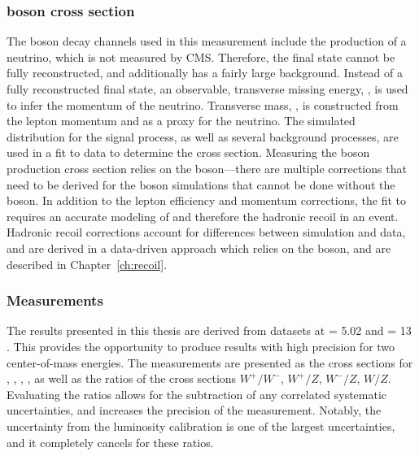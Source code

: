\subsubsection{\W boson cross section}
The \W boson decay channels used in this measurement include the production of a neutrino, which is not measured by CMS. Therefore, the final state cannot be fully reconstructed, and additionally has a fairly large background. Instead of a fully reconstructed final state, an observable, transverse missing energy, \met, is used to infer the momentum of the neutrino. Transverse mass, \mt, is constructed from the lepton momentum and \met as a proxy for the neutrino. The simulated \mt distribution for the \wlnu signal process, as well as several background processes, are used in a fit to data to determine the cross section. 
Measuring the \W boson production cross section relies on the \Z boson---there are multiple corrections that need to be derived for the \W boson simulations that cannot be done without the \Z boson. In addition to the lepton efficiency and momentum corrections, the fit to \mt requires an accurate modeling of \met and therefore the hadronic recoil in an event. Hadronic recoil corrections account for differences between simulation and data, and are derived in a data-driven approach which relies on the \Z boson, and are described in Chapter~\ref{ch:recoil}. 


\subsubsection{Measurements}
The results presented in this thesis are derived from datasets at \s = 5.02 \TeV and \s = 13 \TeV. This provides the opportunity to produce results with high precision for two center-of-mass energies. The measurements are presented as the cross sections for \Wp, \Wm, \W, \Z, as well as the ratios of the cross sections $W^+/W^-$, $W^+/Z$, $W^-/Z$, $W/Z$. Evaluating the ratios allows for the subtraction of any correlated systematic uncertainties, and increases the precision of the measurement. Notably, the uncertainty from the luminosity calibration is one of the largest uncertainties, and it completely cancels for these ratios. 


